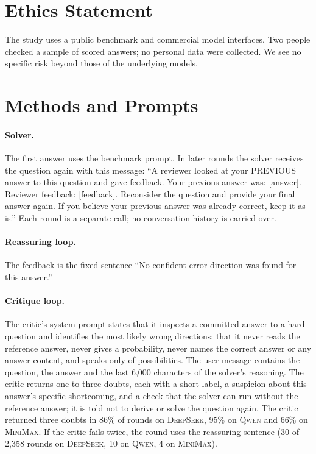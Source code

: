 \documentclass[11pt]{article}
\newcommand{\ds}{\textsc{DeepSeek}}
\newcommand{\qw}{\textsc{Qwen}}
\newcommand{\mm}{\textsc{MiniMax}}
\begin{document}
\section*{Ethics Statement}

The study uses a public benchmark and commercial model interfaces.
Two people checked a sample of scored answers; no personal data were collected.
We see no specific risk beyond those of the underlying models.



\appendix

\section{Methods and Prompts}
\label{app:prompts}

\paragraph{Solver.}
The first answer uses the benchmark prompt.
In later rounds the solver receives the question again with this message: ``A reviewer looked at your PREVIOUS answer to this question and gave feedback. Your previous answer was: [answer]. Reviewer feedback: [feedback]. Reconsider the question and provide your final answer again. If you believe your previous answer was already correct, keep it as is.''
Each round is a separate call; no conversation history is carried over.

\paragraph{Reassuring loop.}
The feedback is the fixed sentence ``No confident error direction was found for this answer.''

\paragraph{Critique loop.}
The critic's system prompt states that it inspects a committed answer to a hard question and identifies the most likely wrong directions; that it never reads the reference answer, never gives a probability, never names the correct answer or any answer content, and speaks only of possibilities.
The user message contains the question, the answer and the last 6{,}000 characters of the solver's reasoning.
The critic returns one to three doubts, each with a short label, a suspicion about this answer's specific shortcoming, and a check that the solver can run without the reference answer; it is told not to derive or solve the question again.
The critic returned three doubts in 86\% of rounds on \ds, 95\% on \qw{} and 66\% on \mm.
If the critic fails twice, the round uses the reassuring sentence (30 of 2{,}358 rounds on \ds, 10 on \qw, 4 on \mm).
\end{document}
